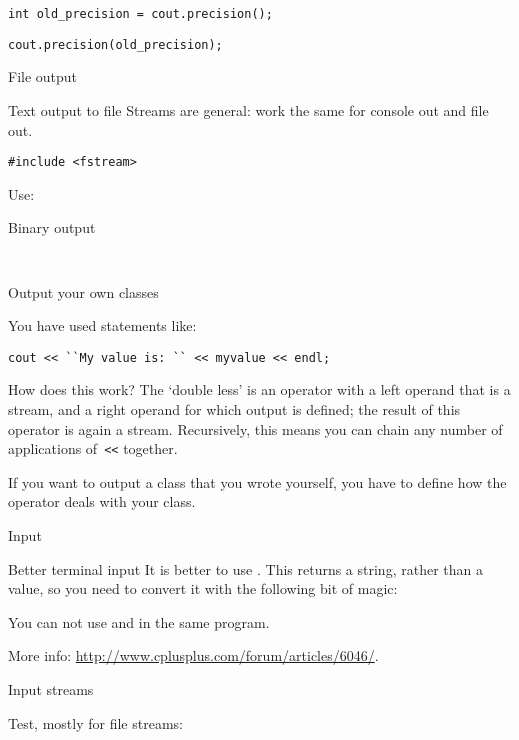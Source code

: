 \begin{verbatim}
int old_precision = cout.precision();
\end{verbatim}

\begin{verbatim}
cout.precision(old_precision);
\end{verbatim}

 {File output}

\begin{block}{Text output to file}
  \label{sl:io-file}
Streams are general: work the same for console out and file out.
\begin{verbatim}
#include <fstream>
\end{verbatim}
Use:
\end{block}

\begin{block}{Binary output}
  \label{sl:io-bin}
\begin{verbatim}
  
\end{verbatim}
\end{block}

 {Output your own classes}
\label{sec:lessless}

You have used statements like:
\begin{verbatim}
cout << ``My value is: `` << myvalue << endl;
\end{verbatim}
How does this work? The `double less' is an operator with a left
operand that is a stream, and a right operand for which output is
defined; the result of this operator is again a stream. Recursively,
this means you can chain any number of applications of~\verb+<<+
together.

If you want to output a class that you wrote yourself, you have to
define how the \n{<<} operator deals with your class.


 {Input}

\begin{block}{Better terminal input}
  \label{sl:getline}
  It is better to use . This returns a string,
  rather than a value, so you need to convert it with the following bit
  of magic:

  You can not use  and  in the same program.

  More info:
  \url{http://www.cplusplus.com/forum/articles/6046/}.

\end{block}

 {Input streams}

Test, mostly for file streams:  

